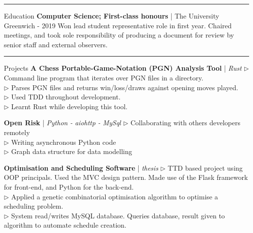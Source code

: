 \documentclass[12pt,twoside]{article}
\begin{document}
\vspace{0.8em}
\hrule
\vspace{0.8em}

\headedsection
    {Education}
    {
        \textbf{Computer Science; First-class honours} | The University
        Greenwich - 2019
    }
    {
        Won lead student representative role in first year. Chaired meetings,
        and took sole responsibility of producing a document for review by
        senior staff and external observers.
    }

\vspace{0.8em}
\hrule
\vspace{0.8em}

\headedsection
    {Projects}
    {\textbf{A Chess Portable-Game-Notation (PGN) Analysis Tool} | \textit{Rust}}
    {
        $\triangleright$ Command line program that iterates over PGN files in a
        directory. \\
        $\triangleright$ Parses PGN files and returns win/loss/draws against
        opening moves played. \\
        $\triangleright$ Used TDD throughout development. \\
        $\triangleright$ Learnt Rust while developing this tool.
    }

\vspace{0.1em}

\headedsection
    {}
    {\textbf{Open Risk} | \textit{Python - aiohttp - MySql}}
    {
        $\triangleright$ Collaborating with others developers remotely \\
        $\triangleright$ Writing asynchronous Python code \\
        $\triangleright$ Graph data structure for data modelling
    }

\vspace{0.1em}

\headedsection
    {}
    {\textbf{Optimisation and Scheduling Software} | \textit{thesis}}
    {
        $\triangleright$ TTD based project using OOP principals. Used the MVC
        design pattern. Made use of the Flask framework for front-end, and
        Python for the back-end. \\
        $\triangleright$ Applied a genetic combinatorial optimisation algorithm
        to optimise a scheduling problem. \\
        $\triangleright$ System read/writes MySQL database. Queries database,
        result given to algorithm to automate schedule creation.
    }

\end{document}
